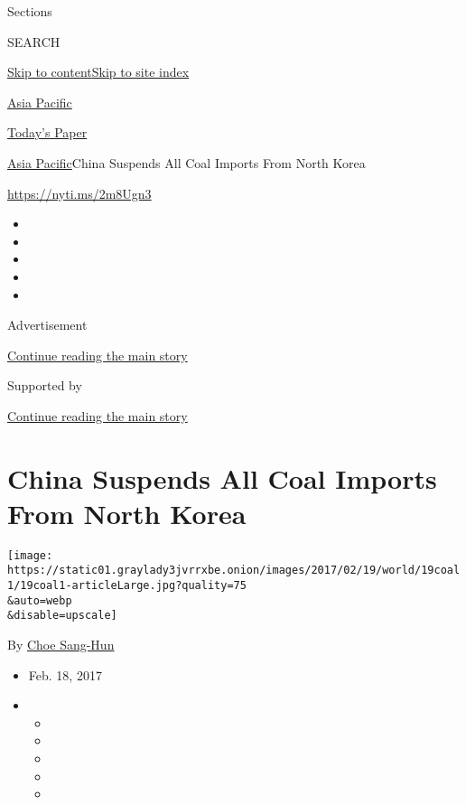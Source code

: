 Sections

SEARCH

\protect\hyperlink{site-content}{Skip to
content}\protect\hyperlink{site-index}{Skip to site index}

\href{https://www.nytimes3xbfgragh.onion/section/world/asia}{Asia
Pacific}

\href{https://myaccount.nytimes3xbfgragh.onion/auth/login?response_type=cookie\&client_id=vi}{}

\href{https://www.nytimes3xbfgragh.onion/section/todayspaper}{Today's
Paper}

\href{/section/world/asia}{Asia Pacific}\textbar{}China Suspends All
Coal Imports From North Korea

\url{https://nyti.ms/2m8Ugn3}

\begin{itemize}
\item
\item
\item
\item
\item
\end{itemize}

Advertisement

\protect\hyperlink{after-top}{Continue reading the main story}

Supported by

\protect\hyperlink{after-sponsor}{Continue reading the main story}

\hypertarget{china-suspends-all-coal-imports-from-north-korea}{%
\section{China Suspends All Coal Imports From North
Korea}\label{china-suspends-all-coal-imports-from-north-korea}}

\texttt{[image: https://static01.graylady3jvrrxbe.onion/images/2017/02/19/world/19coal1/19coal1-articleLarge.jpg?quality=75\\\&auto=webp\\\&disable=upscale]}

By \href{http://www.nytimes3xbfgragh.onion/by/choe-sang-hun}{Choe
Sang-Hun}

\begin{itemize}
\item
  Feb. 18, 2017
\item
  \begin{itemize}
  \item
  \item
  \item
  \item
  \item
  \end{itemize}
\end{itemize}

